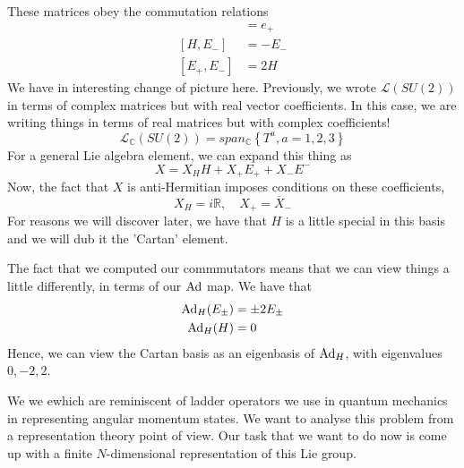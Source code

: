 These matrices obey the commutation relations \begin{align*} [h, e_+ ] & = e_+ \\ 
[H, E_- ] & = - E_- \\ 
[E_+, E_- ] &= 2 H 
\end{align*} We have in interesting 
change of picture here. Previously, we wrote $ \mathcal{ L } ( SU ( 2) ) $ 
in terms of complex matrices but with real vector coefficients. 
In this case, we are writing things in terms of real matrices but 
with complex coefficients! 
\[
	\mathcal{ L }_{ \mathbb { C} } ( SU ( 2) ) = span_{ \mathbb{ C} } \left\{  T ^ a, a = 1, 2, 3 \right\} 
\] For a general Lie algebra element, 
we can expand this thing as 
\[
 X = X_ H H + X_ + E_+ + X_ - E ^ - 
\] Now, the fact that $ X $ is anti-Hermitian imposes 
conditions on these coefficients, 
\[
 X_H = i \mathbb{ R} , \quad X_ + = \overline{ X } _ - 
\] For reasons we will discover later, 
we have that $ H $ is a little special in this basis 
and we will dub it the 'Cartan' element. 

The fact that we computed our commmutators 
means that we can view things a little differently, 
in terms of our $ \text{Ad} $ map. 
We have that 
\begin{align*}
	\text{Ad}_H ( E_{ \pm }) & = \pm 2 E_{ \pm } \\
	\text{Ad} _ H ( H) &=  0 
\end{align*}
Hence, we can view the Cartan basis as an eigenbasis 
of $ \text{Ad} _ H $, with eigenvalues $ 0 , - 2, 2 $. 


We we ewhich are reminiscent of ladder operators we use in quantum mechanics in representing angular momentum states. We want to analyse this problem from a representation theory point of view. Our task that we want to do now is come up with a finite $N$-dimensional representation of this Lie group. 

